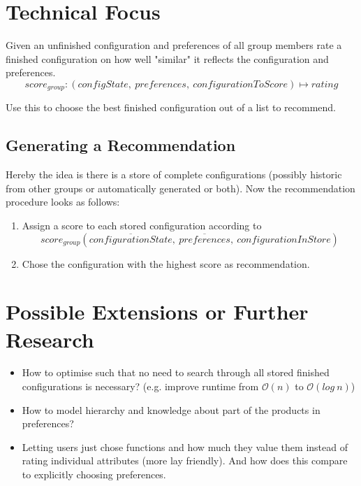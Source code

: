 \documentclass{article}
\begin{document}
\FloatBarrier

\FloatBarrier

\section{Technical Focus}

Given an unfinished configuration and preferences of all group members rate a finished configuration on how well "similar" it reflects the configuration and preferences.
$$score_{group} : (configState,\ preferences,\ configurationToScore) \mapsto rating$$

Use this to choose the best finished configuration out of a list to recommend.

\subsection{Generating a Recommendation}

Hereby the idea is there is a store of complete configurations (possibly historic from other groups or automatically generated or both).
Now the recommendation procedure looks as follows:

\begin{enumerate}
    \item Assign a score to each stored configuration according to $$score_{group}(\overline{configurationState},\ \overline{preferences}, \ configurationInStore)$$
    \item Chose the configuration with the highest score as recommendation.
\end{enumerate}


\section{Possible Extensions or Further Research}

\begin{itemize}
    \item How to optimise such that no need to search through all stored finished configurations is necessary? (e.g. improve runtime from $\mathcal{O}(n)$ to $\mathcal{O}(log\ n)$)
    \item How to model hierarchy and knowledge about part of the products in preferences?
    \item Letting users just chose functions and how much they value them instead of rating individual attributes (more lay friendly). And how does this compare to explicitly choosing preferences.
\end{itemize}
    
\end{document}
